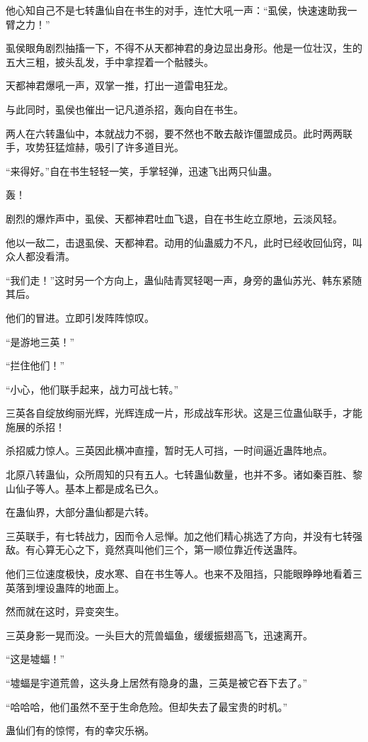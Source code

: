 \begin{this_body}
他心知自己不是七转蛊仙自在书生的对手，连忙大吼一声：“虱侯，快速速助我一臂之力！”

虱侯眼角剧烈抽搐一下，不得不从天都神君的身边显出身形。他是一位壮汉，生的五大三粗，披头乱发，手中拿捏着一个骷髅头。

天都神君爆吼一声，双掌一推，打出一道雷电狂龙。

与此同时，虱侯也催出一记凡道杀招，轰向自在书生。

两人在六转蛊仙中，本就战力不弱，要不然也不敢去敲诈僵盟成员。此时两两联手，攻势狂猛煊赫，吸引了许多道目光。

“来得好。”自在书生轻轻一笑，手掌轻弹，迅速飞出两只仙蛊。

轰！

剧烈的爆炸声中，虱侯、天都神君吐血飞退，自在书生屹立原地，云淡风轻。

他以一敌二，击退虱侯、天都神君。动用的仙蛊威力不凡，此时已经收回仙窍，叫众人都没看清。

“我们走！”这时另一个方向上，蛊仙陆青冥轻喝一声，身旁的蛊仙苏光、韩东紧随其后。

他们的冒进。立即引发阵阵惊叹。

“是游地三英！”

“拦住他们！”

“小心，他们联手起来，战力可战七转。”

三英各自绽放绚丽光辉，光辉连成一片，形成战车形状。这是三位蛊仙联手，才能施展的杀招！

杀招威力惊人。三英因此横冲直撞，暂时无人可挡，一时间逼近蛊阵地点。

北原八转蛊仙，众所周知的只有五人。七转蛊仙数量，也并不多。诸如秦百胜、黎山仙子等人。基本上都是成名已久。

在蛊仙界，大部分蛊仙都是六转。

三英联手，有七转战力，因而令人忌惮。加之他们精心挑选了方向，并没有七转强敌。有心算无心之下，竟然真叫他们三个，第一顺位靠近传送蛊阵。

他们三位速度极快，皮水寒、自在书生等人。也来不及阻挡，只能眼睁睁地看着三英落到埋设蛊阵的地面上。

然而就在这时，异变突生。

三英身影一晃而没。一头巨大的荒兽蝠鱼，缓缓振翅高飞，迅速离开。

“这是墟蝠！”

“墟蝠是宇道荒兽，这头身上居然有隐身的蛊，三英是被它吞下去了。”

“哈哈哈，他们虽然不至于生命危险。但却失去了最宝贵的时机。”

蛊仙们有的惊愕，有的幸灾乐祸。


\end{this_body}
